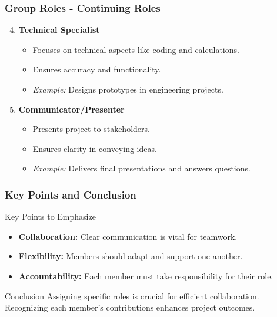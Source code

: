 \documentclass[aspectratio=169]{beamer}
\begin{document}
\begin{frame}[fragile]
    \frametitle{Group Roles - Continuing Roles}
    \begin{enumerate}
        \setcounter{enumi}{3} %
        \item \textbf{Technical Specialist}
            \begin{itemize}
                \item Focuses on technical aspects like coding and calculations.
                \item Ensures accuracy and functionality.
                \item \textit{Example:} Designs prototypes in engineering projects.
            \end{itemize}

        \item \textbf{Communicator/Presenter}
            \begin{itemize}
                \item Presents project to stakeholders.
                \item Ensures clarity in conveying ideas.
                \item \textit{Example:} Delivers final presentations and answers questions.
            \end{itemize}
    \end{enumerate}
\end{frame}

\begin{frame}[fragile]
    \frametitle{Key Points and Conclusion}
    \begin{block}{Key Points to Emphasize}
        \begin{itemize}
            \item \textbf{Collaboration:} Clear communication is vital for teamwork.
            \item \textbf{Flexibility:} Members should adapt and support one another.
            \item \textbf{Accountability:} Each member must take responsibility for their role.
        \end{itemize}
    \end{block}
    
    \begin{block}{Conclusion}
        Assigning specific roles is crucial for efficient collaboration. Recognizing each member's contributions enhances project outcomes.
    \end{block}
\end{frame}
\end{document}
